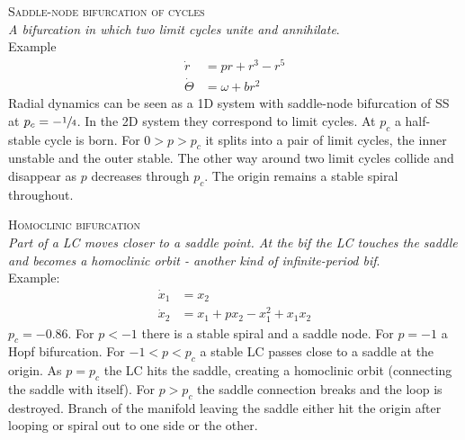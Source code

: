 \textsc{Saddle-node bifurcation of cycles}\\
\emph{A bifurcation in which two limit cycles unite and annihilate}.\\
Example
\begin{align*}
\dot{r}&=pr+r^3-r^5 \\
\dot{\Theta}&=\omega+br^2
\end{align*}
Radial dynamics can be seen as a 1D system with saddle-node bifurcation of SS at $p_c=-\sfrac{1}{4}$. In the 2D system they correspond to limit cycles. At $p_c$ a half-stable cycle is born. For $0>p>p_c$ it splits into a pair of limit cycles, the inner unstable and the outer stable. The other way around two limit cycles collide and disappear as $p$ decreases through $p_c$. The origin remains a stable spiral throughout.
\begin{center}
\end{center}

\vspace{0.2cm}

\textsc{Homoclinic bifurcation}\\
\emph{Part of a LC moves closer to a saddle point. At the bif the LC touches the saddle and becomes a homoclinic orbit - another kind of infinite-period bif}.\\
Example:
\begin{align*}
\dot{x}_1&=x_2\\
\dot{x}_2&=x_1 + px_2 - x_1^2 + x_1x_2
\end{align*}
$p_c=-0.86$. For $p < -1$ there is a stable spiral and a saddle node. For $p=-1$ a Hopf bifurcation. For $-1<p<p_c$ a stable LC passes close to a saddle at the origin. As $p=p_c$ the LC hits the saddle, creating a homoclinic orbit (connecting the saddle with itself). For $p>p_c$ the saddle connection breaks and the loop is destroyed. Branch of the manifold leaving the saddle either hit the origin after looping or spiral out to one side or the other.


